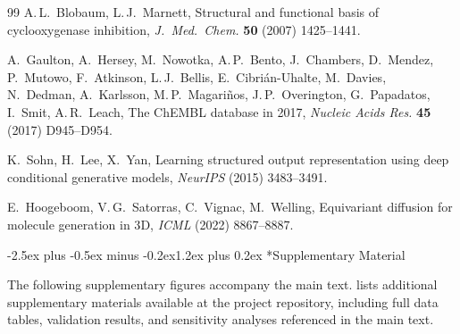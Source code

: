 \documentclass[10pt,a4paper,twocolumn]{article}
\makeatletter
\renewcommand\section{\@startsection{section}{1}{\z@}%
  {-2.5ex plus -0.5ex minus -0.2ex}{1.2ex plus 0.2ex}%
  {\normalfont\Large\bfseries}}
\makeatother
\begin{document}
\begin{thebibliography}{99}
A.\,L.~Blobaum, L.\,J.~Marnett,
Structural and functional basis of cyclooxygenase inhibition,
\textit{J.\ Med.\ Chem.} \textbf{50} (2007) 1425--1441.

A.~Gaulton, A.~Hersey, M.~Nowotka, A.\,P.~Bento, J.~Chambers, D.~Mendez, P.~Mutowo, F.~Atkinson, L.\,J.~Bellis, E.~Cibri{\'a}n-Uhalte, M.~Davies, N.~Dedman, A.~Karlsson, M.\,P.~Magari{\~n}os, J.\,P.~Overington, G.~Papadatos, I.~Smit, A.\,R.~Leach,
The ChEMBL database in 2017,
\textit{Nucleic Acids Res.} \textbf{45} (2017) D945--D954.

K.~Sohn, H.~Lee, X.~Yan,
Learning structured output representation using deep conditional generative models,
\textit{NeurIPS} (2015) 3483--3491.

E.~Hoogeboom, V.\,G.~Satorras, C.~Vignac, M.~Welling,
Equivariant diffusion for molecule generation in 3{D},
\textit{ICML} (2022) 8867--8887.

\end{thebibliography}

\clearpage
\onecolumn
\appendix
\renewcommand{\thefigure}{S\arabic{figure}}
\setcounter{figure}{0}
\renewcommand{\thetable}{S\arabic{table}}
\setcounter{table}{0}

\section*{Supplementary Material}
\label{sec:supplementary}

The following supplementary figures accompany the main text.  lists additional supplementary materials available at the project repository, including full data tables, validation results, and sensitivity analyses referenced in the main text.
\end{document}
